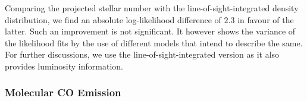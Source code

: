 \documentclass[doublespace,nopageskip]{VTthesis}
\newcommand{\mrm}[1]{\mathrm{#1}}
\begin{document}



Comparing the projected stellar number with the line-of-sight-integrated density distribution, we find an absolute log-likelihood difference of $2.3$ in favour of the latter.
%
Such an improvement is not significant.
%
It however shows the variance of the likelihood fits by the use of different models that intend to describe the same.
%
For further discussions, we use the line-of-sight-integrated version as it also provides luminosity information.


\subsubsection{Molecular CO Emission}
\end{document}
